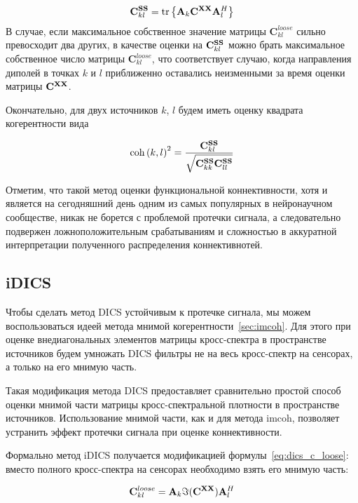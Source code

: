 \begin{equation}
    \mathbf{C}^{\mathbf{S S}}_{kl} = \operatorname{tr}\left\{\mathbf{A}_k \mathbf{C}^{\mathbf{X X}} \mathbf{A}_l^H\right\}
\end{equation}
В случае, если максимальное собственное значение матрицы $\mathbf{C}^{loose}_{kl}$
сильно превосходит два других, в качестве оценки на $\mathbf{C}^{\mathbf{S S}}_{kl}$ можно брать
максимальное собственное число матрицы $\mathbf{C}^{loose}_{kl}$, что соответствует
случаю, когда направления диполей в точках $k$ и $l$ приближенно оставались неизменными
за время оценки матрицы $\mathbf{C}^{\mathbf{X X}}$.

Окончательно, для двух источников $k$, $l$ будем иметь оценку квадрата когерентности вида

\begin{equation}
    \operatorname{coh}{(k, l)}^2 = \frac{\mathbf{C}^{\mathbf{S S}}_{kl}}{\sqrt{\mathbf{C}^{\mathbf{S S}}_{kk} \mathbf{C}^{\mathbf{S S}}_{ll}}}
\end{equation}

Отметим, что такой метод оценки функциональной коннективности, хотя и является на сегодняшний
день одним из самых популярных в нейронаучном сообществе, никак не борется с проблемой
протечки сигнала, а следовательно подвержен ложноположительным срабатываниям и сложностью
в аккуратной интерпретации полученного распределения коннективнотей.

\subsection{iDICS}
Чтобы сделать метод DICS устойчивым к протечке сигнала, мы можем воспользоваться
идеей метода мнимой когерентности~\ref{sec:imcoh}. Для этого при оценке внедиагональных
элементов матрицы кросс-спектра в пространстве источников будем умножать DICS фильтры
не на весь кросс-спектр на сенсорах, а только на его мнимую часть.

Такая модификация метода DICS предоставляет сравнительно простой способ
оценки мнимой части матрицы кросс-спектральной плотности в пространстве
источников. Использование мнимой части, как и для метода imcoh, позволяет
устранить эффект протечки сигнала при оценке коннективности.

Формально метод iDICS получается модификацией формулы~\ref{eq:dics_c_loose}:
вместо полного кросс-спектра на сенсорах необходимо взять его мнимую часть:

\begin{equation}
    \mathbf{C}^{loose}_{kl} = \mathbf{A}_k \Im(\mathbf{C}^{\mathbf{X X}}) \mathbf{A}_l^H
    \label{eq:idics_c_loose}
\end{equation}

